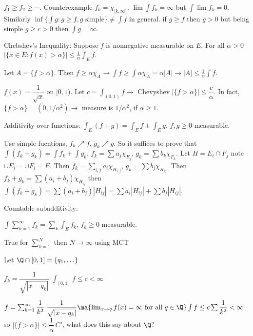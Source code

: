 \begin{ex}
$f_1 \geq f_2 \geq \cdots$. Counterexample $f_k= \chi_{[k,\infty)}$. $\lim \int f_k= \infty$ but $\int \lim f_k=0$. Similarly $\inf\{ \int g \colon g \geq f, g \text{ simple}\} \neq \int f$ in general. if $g \geq f$ then $g>0$ but being simple $g \geq c>0$ then $\int g= \infty$. 
\end{ex}


Chebshev's Inequality: Suppose $f$ is nonnegative measurable on $E$. For all $\alpha>0$ $|\{ x \in E \colon f(x)>\alpha \}| \leq \frac{1}{\alpha} \int_E f$.

\pf Let $A=\{f>\alpha\}$. Then $f \geq \alpha \chi_A \to \int f \geq \int \alpha \chi_A= \alpha |A| \to |A| \leq \frac{1}{\alpha} \int f$.


\begin{ex}
$f(x)= \dfrac{1}{\sqrt{x}}$ on $[0,1)$. Let $c= \int_{(0,1)} f \to$ Chevyshev $|\{f>\alpha\}| \leq \dfrac{c}{\alpha}$. In fact, $\{f>\alpha\}= (0,1/\alpha^2) \to$ measure is $1/\alpha^2$, if $\alpha \geq 1$. 
\end{ex}



Additivity over functions: $\int_E (f+g)= \int_E f + \int_E g$, $f,g \geq 0$ measurable. 

\pf Use simple fucntions, $f_k \nearrow f$, $g_k \nearrow g$. So it suffices to prove that $\int (f_k+g_k)= \int f_k + \int g_k$. $f_k= \sum a_j \chi_{E_j}$, $g_k = \sum b_k \chi_{F_k}$. Let $H= E_i \cap F_j$ note $\cup E_i= \cup F_i = E$. Then $f_k= \sum_{i,j} a_i \chi_{H_{i,j}}$, $g_k= \sum b_j \chi_{H_{ij}}$. Then $f_k+g_k= \sum (a_i+b_j) \chi_{H_{ij}}$ then $\int (f_k+g_k) = \sum (a_i+b_j) |H_{ij}|= \sum a_i |H_{ij}| + \sum b_j |H_{ij}|$. 

Countable subadditivity:

$\int \sum_{k=1}^\infty f_k = \sum_k \int_E f_k$, $f_k \geq 0$ measurable.

True for $\sum_{k=1}^N$ then $N \to \infty$ using MCT


\begin{ex}
Let $\Q \cap [0,1]= \{q_1,\ldots\}$

$f_k= \dfrac{1}{\sqrt{|x-q_k|}}$ $\int_{[0,1]} f \leq c < \infty$

$f= \sum_{k=1}^\infty \dfrac{1}{k^2} \; \dfrac{1}{\sqrt{|x-q_k|}} \ma{\lim_{x \to q} f(x)=\infty \text{ for all } q \in \Q} \int f \leq c \sum \dfrac{1}{k^2}< \infty$ so $|\{f>\alpha\}| \leq \dfrac{1}{\alpha}\, C'$, what does this say about $\Q$?
\end{ex}




